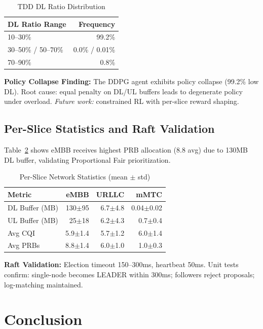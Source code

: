 \documentclass[journal]{IEEEtran}
\begin{document}
\begin{table}[h]
\centering
\caption{TDD DL Ratio Distribution}
\label{tab:tdd}
\begin{tabular}{@{}lr@{}}
\toprule
\textbf{DL Ratio Range} & \textbf{Frequency} \\
\midrule
10--30\% & 99.2\% \\
30--50\% / 50--70\% & 0.0\% / 0.01\% \\
70--90\% & 0.8\% \\
\bottomrule
\end{tabular}
\end{table}

\textbf{Policy Collapse Finding:} The DDPG agent exhibits policy collapse (99.2\% low DL). Root cause: equal penalty on DL/UL buffers leads to degenerate policy under overload. \textit{Future work:} constrained RL with per-slice reward shaping.

\subsection{Per-Slice Statistics and Raft Validation}

Table~\ref{tab:slice_stats} shows eMBB receives highest PRB allocation (8.8 avg) due to 130MB DL buffer, validating Proportional Fair prioritization.

\begin{table}[h]
\centering
\caption{Per-Slice Network Statistics (mean $\pm$ std)}
\label{tab:slice_stats}
\begin{tabular}{@{}lrrr@{}}
\toprule
\textbf{Metric} & \textbf{eMBB} & \textbf{URLLC} & \textbf{mMTC} \\
\midrule
DL Buffer (MB) & 130$\pm$95 & 6.7$\pm$4.8 & 0.04$\pm$0.02 \\
UL Buffer (MB) & 25$\pm$18 & 6.2$\pm$4.3 & 0.7$\pm$0.4 \\
Avg CQI & 5.9$\pm$1.4 & 5.7$\pm$1.2 & 6.0$\pm$1.4 \\
Avg PRBs & 8.8$\pm$1.4 & 6.0$\pm$1.0 & 1.0$\pm$0.3 \\
\bottomrule
\end{tabular}
\end{table}

\textbf{Raft Validation:} Election timeout 150--300ms, heartbeat 50ms. Unit tests confirm: single-node becomes LEADER within 300ms; followers reject proposals; log-matching maintained.

\section{Conclusion}
\end{document}

